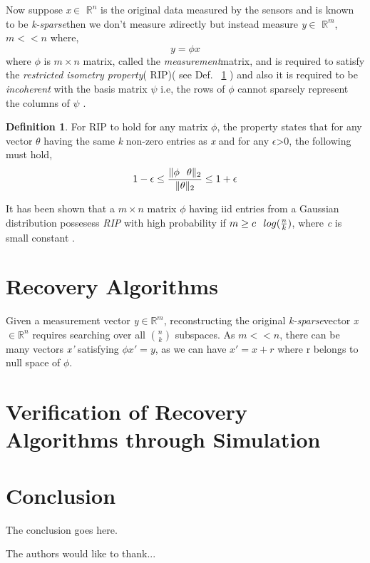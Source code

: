 \documentclass[12pt]{article}
\theoremstyle{definition}
\newtheorem{defn}{Definition}[section]
\def\ksparse{\textit{k-sparse}\hspace{0.1in}}
\def\measurement{\textit{measurement}\hspace{0.1in}}
\def\x{\textit{x}\hspace{0.1in}}
\def\y{\textit{y}\hspace{0.1in}}
\begin{document}
\par Now suppose \textit{x}$\in$ $\mathbb{R}^n$ is the original data measured by the sensors and 
is known to be \ksparse then we don't measure \x directly but instead measure \y$\in$ $\mathbb{R}^m$, $m << n$ where,
\begin{equation}
 y = \phi x
\end{equation}
where $\phi$ is $m\times n$ matrix, called the \measurement matrix, and is required to satisfy the \textit{restricted
isometry property}( RIP)( see Def. ~\ref{def:RIP} ) and also it is required to be \textit{incoherent} with the basis matrix $\psi$ 
i.e, the rows of $\phi$ cannot sparsely represent the columns of $\psi$ \cite{Baraniuk-CS}.
\begin{defn}
 For RIP to hold for any matrix $\phi$, the property states that for any vector $\theta$ having the 
 same \textit{k} non-zero entries as \textit{x}
 and for any $\epsilon$>0, the following must hold,
 \begin{equation}
  1 - \epsilon \leq \frac{\|\phi\hspace{0.1in}\theta\|_2}{\|\theta\|_2} \leq 1 + \epsilon
 \end{equation}
 \label{def:RIP}
  \end{defn}
 \par It has been shown that a $m \times n$ matrix $\phi$ having iid entries from a Gaussian distribution
  possesess \textit{RIP} with high probability if $m \geq c\hspace{0.1in}log(\frac{n}{k})$, 
 where \textit{c} is small constant \cite{Baraniuk-CS}.

\section{Recovery Algorithms}
Given a measurement vector \y $\in \mathbb{R}^m$, reconstructing the original \ksparse vector \x $\in \mathbb{R}^n$
requires searching over all $\binom{n}{k}$ subspaces. As $m << n$, there can be many vectors \textit{x'} satisfying
$\phi x'=y$, as we can have $x'=x+r$ where r belongs to null space of $\phi$.
\section{Verification of Recovery Algorithms through Simulation}
\section{Conclusion}
The conclusion goes here.

The authors would like to thank...\cite{Whitmore-survey} \cite{Huang-DGS}




\end{document}
